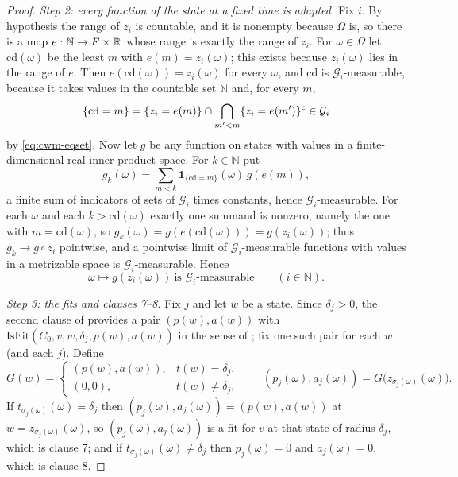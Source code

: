 \begin{proof}
\emph{Step 2: every function of the state at a fixed time is adapted.}
Fix $i$. By hypothesis the range of $z_i$ is countable, and it is nonempty
because $\Omega$ is, so there is a map $e:\mathbb N\to F\times\mathbb{R}$ whose range is
exactly the range of $z_i$. For $\omega\in\Omega$ let $\mathrm{cd}(\omega)$ be
the least $m$ with $e(m)=z_i(\omega)$; this exists because
$z_i(\omega)$ lies in the range of $e$. Then
$e(\mathrm{cd}(\omega))=z_i(\omega)$ for every $\omega$, and $\mathrm{cd}$ is
$\mathcal G_i$-measurable, because it takes values in the countable set
$\mathbb N$ and, for every $m$,
\[
  \{\mathrm{cd}=m\}
   =\{z_i=e(m)\}\cap\bigcap_{m'<m}\{z_i=e(m')\}^{\rm c}\in\mathcal G_i
\]
by \eqref{eq:cwm-eqset}. Now let $g$ be any function on states with values in a
finite-dimensional real inner-product space. For $k\in\mathbb N$ put
\[
  g_k(\omega)=\sum_{m<k}\mathbf 1_{\{\mathrm{cd}=m\}}(\omega)\,g(e(m)) ,
\]
a finite sum of indicators of sets of $\mathcal G_i$ times constants, hence
$\mathcal G_i$-measurable. For each $\omega$ and each $k>\mathrm{cd}(\omega)$
exactly one summand is nonzero, namely the one with $m=\mathrm{cd}(\omega)$, so
$g_k(\omega)=g(e(\mathrm{cd}(\omega)))=g(z_i(\omega))$; thus $g_k\to g\circ z_i$
pointwise, and a pointwise limit of $\mathcal G_i$-measurable functions with
values in a metrizable space is $\mathcal G_i$-measurable. Hence
\begin{equation}\label{eq:cwm-sel}
  \omega\mapsto g(z_i(\omega))\ \text{is }\mathcal G_i\text{-measurable}
  \qquad(i\in\mathbb N).
\end{equation}

\emph{Step 3: the fits and clauses 7--8.}
Fix $j$ and let $w$ be a state. Since $\delta_j>0$, the second clause of
 provides a pair $(p(w),a(w))$ with
$\mathrm{IsFit}(C_0,v,w,\delta_j,p(w),a(w))$ in the sense of ;
fix one such pair for each $w$ (and each $j$). Define
\[
  G(w)=\begin{cases}(p(w),a(w)),&t(w)=\delta_j,\\(0,0),&t(w)\ne\delta_j,\end{cases}
  \qquad
  (p_j(\omega),a_j(\omega))=G\bigl(z_{\sigma_j(\omega)}(\omega)\bigr).
\]
If $t_{\sigma_j(\omega)}(\omega)=\delta_j$ then
$(p_j(\omega),a_j(\omega))=(p(w),a(w))$ at $w=z_{\sigma_j(\omega)}(\omega)$, so
$(p_j(\omega),a_j(\omega))$ is a fit for $v$ at that state of radius $\delta_j$,
which is clause 7; and if $t_{\sigma_j(\omega)}(\omega)\ne\delta_j$ then
$p_j(\omega)=0$ and $a_j(\omega)=0$, which is clause 8.


\end{proof}
